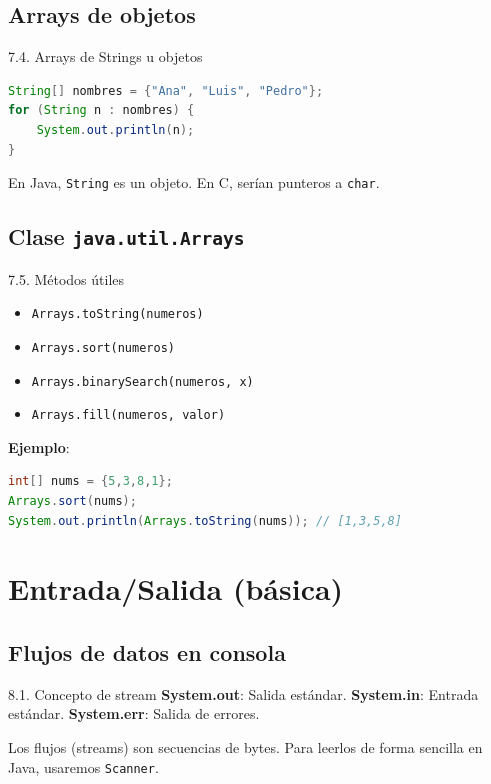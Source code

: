 \documentclass{beamer}
\begin{document}
\subsection{Arrays de objetos}

\begin{frame}[fragile]{7.4. Arrays de Strings u objetos}
\begin{lstlisting}[language=Java]
String[] nombres = {"Ana", "Luis", "Pedro"};
for (String n : nombres) {
    System.out.println(n);
}
\end{lstlisting}

En Java, \texttt{String} es un objeto.  
En C, serían punteros a \texttt{char}.
\end{frame}

\subsection{Clase \texttt{java.util.Arrays}}

\begin{frame}[fragile]{7.5. Métodos útiles}
\begin{itemize}
  \item \texttt{Arrays.toString(numeros)}
  \item \texttt{Arrays.sort(numeros)}
  \item \texttt{Arrays.binarySearch(numeros, x)}
  \item \texttt{Arrays.fill(numeros, valor)}
\end{itemize}

\textbf{Ejemplo}:
\begin{lstlisting}[language=Java]
int[] nums = {5,3,8,1};
Arrays.sort(nums);
System.out.println(Arrays.toString(nums)); // [1,3,5,8]
\end{lstlisting}
\end{frame}

\section{Entrada/Salida (básica)}

\subsection{Flujos de datos en consola}

\begin{frame}{8.1. Concepto de stream}
\textbf{System.out}: Salida estándar.  
\textbf{System.in}: Entrada estándar.  
\textbf{System.err}: Salida de errores.

Los flujos (streams) son secuencias de bytes. Para leerlos de forma sencilla en Java, usaremos \texttt{Scanner}.
\end{frame}
\end{document}

